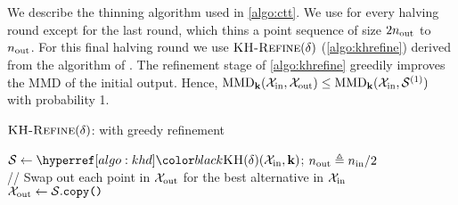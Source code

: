 \section{\ktcompressd}
\label{app:ktcompress}

We describe the thinning algorithm \ktcompressd used in \cref{algo:ctt}. We use \khd for every halving round except for the last round, which thins a point sequence of size $2 \nout$ to $\nout$. For this final halving round we use  $\textsc{KH-Refine}(\delta)$ (\cref{algo:khrefine}) derived from the \ktswap algorithm of \citet[Alg.~1a]{dwivedi2024kernel}. 
The refinement stage of 
\cref{algo:khrefine} greedily improves the MMD of the initial \khd output. 
Hence, $\mmd_\k(\xin, \xout) \leq \mmd_\k(\xin,\coreset[1])$ with probability 1.

\begin{algorithm2e}[ht!]
\caption{$\textsc{KH-Refine}(\delta)$: \khd with greedy refinement \citep[Alg.~1a]{dwivedi2024kernel}} 
  \label{algo:khrefine}
 \SetAlgoLined\DontPrintSemicolon
\small
{
        \BlankLine
        $\cset \gets \khd (\xin, \k)$; \quad $\nout \defeq \nin / 2$ \\
        \BlankLine
        // Swap out each point in $\xout$ for the best alternative in $\xin$ \\[1pt]
        $\xout \gets \cset.\texttt{copy()}$\\
}
\end{algorithm2e}

